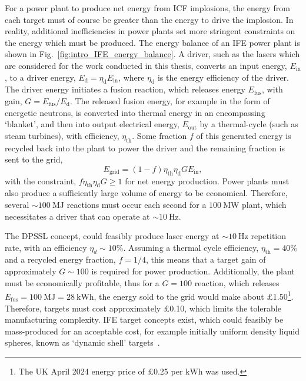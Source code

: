For a power plant to produce net energy from \ac{ICF} implosions, the energy from each target must of course be greater than the energy to drive the implosion.
In reality, additional inefficiencies in power plants set more stringent constraints on the energy which must be produced.
The energy balance of an \ac{IFE} power plant is shown in Fig.~\ref{fig:intro_IFE_energy_balance}.
A driver, such as the lasers which are considered for the work conducted in this thesis, converts an input energy, $E_{\text{in}}$, to a driver energy, $E_{\text{d}} = \eta_{\text{d}}E_{\text{in}}$, where $\eta_{\text{d}}$ is the energy efficiency of the driver.
The driver energy initiates a fusion reaction, which releases energy $E_{\text{fus}}$, with gain, $G = E_{\text{fus}}/E_{\text{d}}$.
The released fusion energy, for example in the form of energetic neutrons, is converted into thermal energy in an encompassing `blanket', and then into output electrical energy, $E_\text{out}$ by a thermal-cycle (such as steam turbines), with efficiency, $\eta_{\text{th}}$.
Some fraction $f$ of this generated energy is recycled back into the plant to power the driver and the remaining fraction is sent to the grid,
\begin{equation}
    E_{\text{grid}} = (1-f) \eta_{\text{th}} \eta_{\text{d}} G E_{\text{in}},
\end{equation}
with the constraint, $f \eta_{\text{th}} \eta_{\text{d}} G \geq 1$ for net energy production.
Power plants must also produce a sufficiently large volume of energy to be economical.
Therefore, several $\sim100\ \text{MJ}$ reactions must occur each second for a $100\ \text{MW}$ plant, which necessitates a driver that can operate at $\sim10\ \text{Hz}$.

The \ac{DPSSL} concept, could feasibly produce laser energy at $\sim10\ \text{Hz}$ repetition rate, with an efficiency $\eta_d\sim10\%$.
Assuming a thermal cycle efficiency, $\eta_{\text{th}}=40\%$ and a recycled energy fraction, $f=1/4$, this means that a target gain of approximately $G\sim100$ is required for power production.
Additionally, the plant must be economically profitable, thus for a $G=100$ reaction, which releases $E_{\text{fus}} = 100\ \text{MJ} = 28\ \text{kWh}$, the energy sold to the grid would make about £1.50\footnote{The UK April 2024 energy price of £0.25 per $\text{kWh}$ was used.}.
Therefore, targets must cost approximately £0.10, which limits the tolerable manufacturing complexity.
\ac{IFE} target concepts exist, which could feasibly be mass-produced for an acceptable cost, for example initially uniform density liquid spheres, known as `dynamic shell' targets~\cite{goncharov_novel_2020,igumenshchev_proofprinciple_2023}.

